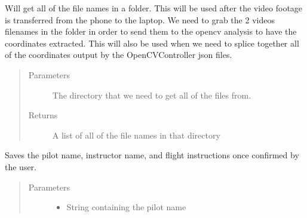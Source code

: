 \documentclass[letterpaper,10pt,english]{sphinxmanual}
\begin{document}
\begin{fulllineitems}

\begin{fulllineitems}
\label{\detokenize{index:src.Controllers.Program_Controller.Controller.get_all_files}}
Will get all of the file names in a folder. This will be used after the video footage is transferred from
the phone to the laptop. We need to grab the 2 videos filenames in the folder in order to send them to
the opencv analysis to have the coordinates extracted. This will also be used when we need to splice
together all of the coordinates output by the OpenCVController json files.
\begin{quote}\begin{description}
\item[{Parameters}] \leavevmode
{} \textendash{} The directory that we need to get all of the files from.

\item[{Returns}] \leavevmode
A list of all of the file names in that directory

\end{description}\end{quote}

\end{fulllineitems}


\begin{fulllineitems}
\label{\detokenize{index:src.Controllers.Program_Controller.Controller.get_flight_info}}
Saves the pilot name, instructor name, and flight instructions once confirmed by the user.
\begin{quote}\begin{description}
\item[{Parameters}] \leavevmode\begin{itemize}
\item {} 
 \textendash{} String containing the pilot name


\end{itemize}
\end{description}
\end{quote}
\end{fulllineitems}
\end{fulllineitems}
\end{document}
